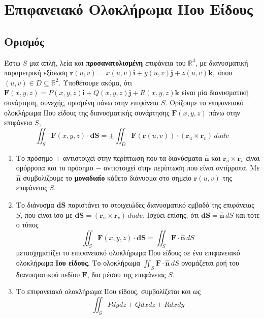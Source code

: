 




\pagestyle{askhseis}



\chapter*{Επιφανειακό Ολοκλήρωμα ΙΙου Είδους}

\setcounter{chapter}{1}

\section{Ορισμός}

Έστω $ S $ μια απλή, λεία και \textbf{προσανατολισμένη} επιφάνεια του 
$ \mathbb{R}^{3} $, με διανυσματική παραμετρική εξίσωση $ \mathbf{r}(u,v) =
x(u,v)\mathbf{i}+y(u,v)\mathbf{j}+z(u,v)\mathbf{k}, $ όπου $ (u,v) \in D \subseteq
\mathbb{R}^{2} $. Υποθέτουμε ακόμα, ότι $ \mathbf{F}(x,y,z) =
P(x,y,z)\mathbf{i}+Q(x,y,z)\mathbf{j}+R(x,y,z)\mathbf{k} $ είναι μία διανυσματική 
συνάρτηση, συνεχής, ορισμένη πάνω στην επιφάνεια $S$. Ορίζουμε το 
\textcolor{Col1}{επιφανειακό ολοκλήρωμα ΙΙου είδους} της διανυσματικής συνάρτησης 
$ \mathbf{F}(x,y,z) $ πάνω στην επιφάνεια $S$,
\[
  \iint_{S} \mathbf{F}(x,y,z) \cdot \mathbf{dS}  = \pm \iint_{D} 
  \mathbf{F}(\mathbf{r}(u,v)) \cdot (\mathbf{r}_{u} \times \mathbf{r}_{v}) \, dudv   
\]

\begin{rems}
\item {}
  \begin{enumerate}
    \item Το πρόσημο $ + $ αντιστοιχεί στην περίπτωση που τα διανύσματα 
      $ \mathbf{\widehat{n}} $ και $ \mathbf{r}_{u} \times \mathbf{r}_{v} $ 
      είναι ομόρροπα και το πρόσημο $ - $ αντιστοιχεί στην περίπτωση που είναι 
      αντίρροπα. Με $ \mathbf{\widehat{n}} $ συμβολίζουμε το \textbf{μοναδιαίο} κάθετο 
      διάνυσμα στο σημείο $ \mathbf{r}(u,v) $ της επιφάνειας $S$.
    \item Το διάνυσμα $ \mathbf{dS} $ παριστάνει το στοιχειώδες διανυσματικό εμβαδό 
      της επιφάνειας $S$, που είναι ίσο με $ \mathbf{dS} = (\mathbf{r}_{u} \times
      \mathbf{r}_{v})\, du dv $. Ισχύει επίσης, ότι $ \mathbf{dS} = \mathbf{\widehat{n}}
      \,dS $ και τότε ο τύπος 
      \begin{equation}\label{eq:flux1}
        \boxed{\iint_{S} \mathbf{F}(x,y,z) \cdot \mathbf{dS} = \iint_{S} \mathbf{F} \cdot
        \mathbf{\widehat{n}} \,{dS}}
      \end{equation} 
      μετασχηματίζει το επιφανειακό ολοκλήρωμα ΙΙου είδους σε ένα επιφανειακό 
      ολοκλήρωμα \textbf{Ιου είδους}. Το ολοκλήρωμα $ \iint_{S} \mathbf{F}\cdot
      \mathbf{\widehat{n}} \,{dS} $ ονομάζεται \textcolor{Col1}{ροή} του 
      διανυσματικού πεδίου $ \mathbf{F} $, \textcolor{Col1}{δια μέσου} της επιφάνειας 
      $S$.
    \item Το επιφανειακό ολοκλήρωμα ΙΙου είδους, συμβολίζεται και ως 
      \[
        \iint_{S} Pdydz + Qdxdz + Rdxdy 
      \] 
  \end{enumerate}
\end{rems} 

